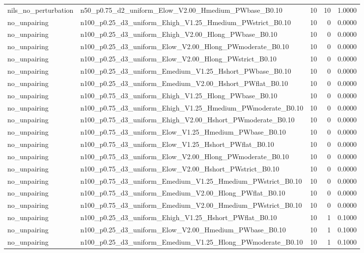 \begin{tabular}{llrrr}
nils_no_perturbation & n50_p0.75_d2_uniform_Elow_V2.00_Hmedium_PWbase_B0.10 & 10 & 10 & 1.0000 \\
no_unpairing & n100_p0.25_d3_uniform_Ehigh_V1.25_Hmedium_PWstrict_B0.10 & 10 & 0 & 0.0000 \\
no_unpairing & n100_p0.25_d3_uniform_Ehigh_V2.00_Hlong_PWbase_B0.10 & 10 & 0 & 0.0000 \\
no_unpairing & n100_p0.25_d3_uniform_Elow_V2.00_Hlong_PWmoderate_B0.10 & 10 & 0 & 0.0000 \\
no_unpairing & n100_p0.25_d3_uniform_Elow_V2.00_Hlong_PWstrict_B0.10 & 10 & 0 & 0.0000 \\
no_unpairing & n100_p0.25_d3_uniform_Emedium_V1.25_Hshort_PWbase_B0.10 & 10 & 0 & 0.0000 \\
no_unpairing & n100_p0.25_d3_uniform_Emedium_V2.00_Hshort_PWflat_B0.10 & 10 & 0 & 0.0000 \\
no_unpairing & n100_p0.75_d3_uniform_Ehigh_V1.25_Hlong_PWbase_B0.10 & 10 & 0 & 0.0000 \\
no_unpairing & n100_p0.75_d3_uniform_Ehigh_V1.25_Hmedium_PWmoderate_B0.10 & 10 & 0 & 0.0000 \\
no_unpairing & n100_p0.75_d3_uniform_Ehigh_V2.00_Hshort_PWmoderate_B0.10 & 10 & 0 & 0.0000 \\
no_unpairing & n100_p0.75_d3_uniform_Elow_V1.25_Hmedium_PWbase_B0.10 & 10 & 0 & 0.0000 \\
no_unpairing & n100_p0.75_d3_uniform_Elow_V1.25_Hshort_PWflat_B0.10 & 10 & 0 & 0.0000 \\
no_unpairing & n100_p0.75_d3_uniform_Elow_V2.00_Hlong_PWmoderate_B0.10 & 10 & 0 & 0.0000 \\
no_unpairing & n100_p0.75_d3_uniform_Elow_V2.00_Hshort_PWstrict_B0.10 & 10 & 0 & 0.0000 \\
no_unpairing & n100_p0.75_d3_uniform_Emedium_V1.25_Hmedium_PWstrict_B0.10 & 10 & 0 & 0.0000 \\
no_unpairing & n100_p0.75_d3_uniform_Emedium_V2.00_Hlong_PWflat_B0.10 & 10 & 0 & 0.0000 \\
no_unpairing & n100_p0.75_d3_uniform_Emedium_V2.00_Hmedium_PWstrict_B0.10 & 10 & 0 & 0.0000 \\
no_unpairing & n100_p0.25_d3_uniform_Ehigh_V1.25_Hshort_PWflat_B0.10 & 10 & 1 & 0.1000 \\
no_unpairing & n100_p0.25_d3_uniform_Elow_V2.00_Hmedium_PWbase_B0.10 & 10 & 1 & 0.1000 \\
no_unpairing & n100_p0.25_d3_uniform_Emedium_V1.25_Hlong_PWmoderate_B0.10 & 10 & 1 & 0.1000 \\

\end{tabular}
